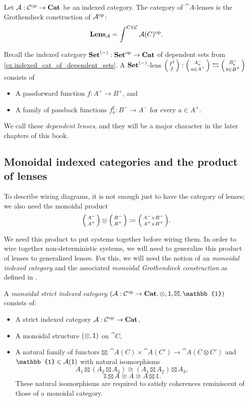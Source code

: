 \documentclass[DynamicalBook]{subfiles}
\begin{document}
\begin{definition}\label{def.groth_lens}
 Let $\mathcal{A} : \mathcal{C}^{\textnormal{op}} \to \textbf{Cat}$ be an indexed category. The category of $\cat{A}$-lenses is the Grothendieck construction of
     $\mathcal{A}^{\textnormal{op}}$:
$$\textbf{Lens}_{\mathcal{A}} = \int^{C \in \mathcal{C}} \mathcal{A}(C)^{\textnormal{op}}.$$
\end{definition}

\begin{example}\label{ex.dependent_lenses_via_groth}
Recall the indexed category $\textbf{Set}^{(-)} : \textbf{Set}^{\textnormal{op}} \to \textbf{Cat}$ of
dependent sets from \cref{ex.indexed_cat_of_dependent_sets}. A
$\textbf{Set}^{(-)}$-lens $\lens{f^{\sharp}}{f} : \lens{A^-_a}{a \in A^+} \fromto
\lens{B^-_b}{b \in B^+}$ consists of
\begin{itemize}
\item A passforward function $f : A^+ \to B^+$, and
  \item A family of passback functions $f^{\sharp}_{a} : B^- \to A^-$ for every
    $a \in A^+$.
\end{itemize}
We call these \emph{dependent lenses}, and they will be a major character in the
later chapters of this book.
\end{example}

\subsection{Monoidal indexed categories and the product of lenses}

To describe wiring diagrams, it is not enough just to have the category of
lenses; we also need the monoidal product 
$$\lens{A^-}{A^+} \otimes \lens{B^-}{B^+} \coloneqq \lens{A^- \times B^-}{A^+
  \times B^+}.$$

We need this product to put systems together before wiring them. In order to
wire together non-deterministic systems, we will need to generalize this product
of lenses to generalized lenses. For this, we will need the notion of an
\emph{monoidal indexed category} and the associated \emph{monoidal Grothendieck
  construction} as defined in \cite{MoellerVasilakopolou}.

\begin{definition}\label{def.monoidal_indexed}
A \emph{monoidal strict indexed category} $(\cat{A} : \cat{C}\op \to \Cat{Cat},
\otimes, \ord{1}, \boxtimes, \mathbb{1})$ consists of:
\begin{itemize}
  \item A strict indexed category $\mathcal{A} : \mathcal{C}^{\textnormal{op}} \to \textbf{Cat}$,
\item A monoidal structure $(\otimes, \mathsf{1})$ on $\cat{C}$,
\item A natural family of functors $\boxtimes : \cat{A}(C) \times \cat{A}(C')
  \to \cat{A}(C \otimes C')$ and $\mathbb{1} \in \cat{A}(\ord{1})$ with natural
  isomorphisms 
$$A_1 \boxtimes (A_2 \boxtimes A_3) \cong (A_1 \boxtimes A_2) \boxtimes A_3,$$
$$\mathbb{1} \boxtimes A \cong A \cong A \boxtimes \mathbb{1}.$$
These natural isomorphisms are required to satisfy coherences reminiscent of
those of a monoidal category.
\end{itemize}
\end{definition}
\end{document}
